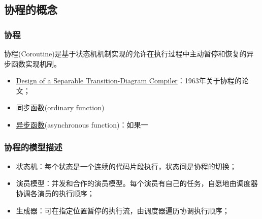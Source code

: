 \subsection{协程的概念}
% 
\begin{frame}[fragile]
    \frametitle{协程}
% 
协程(Coroutine)是基于状态机机制实现的允许在执行过程中主动暂停和恢复的异步函数实现机制。

    \begin{itemize}
        \item \href{http://melconway.com/Home/pdf/compiler.pdf}{Design of a Separable Transition-Diagram Compiler}：1963年关于协程的论文；
        \item 同步函数(ordinary function)%
        \item \href{https://www.cnblogs.com/balingybj/p/4780442.html}{异步函数}(asynchronous function)：如果一%
    \end{itemize}

% 

\end{frame}
\begin{frame}[fragile]
    \frametitle{协程的模型描述}

    \begin{itemize}
        \item 状态机：每个状态是一个连续的代码片段执行，状态间是协程的切换；
        \item 演员模型：并发和合作的演员模型。每个演员有自己的任务，自愿地由调度器协调各演员的执行顺序；
        \item 生成器：可在指定位置暂停的执行流，由调度器遍历协调执行顺序；
    \end{itemize}
\end{frame}
% 
